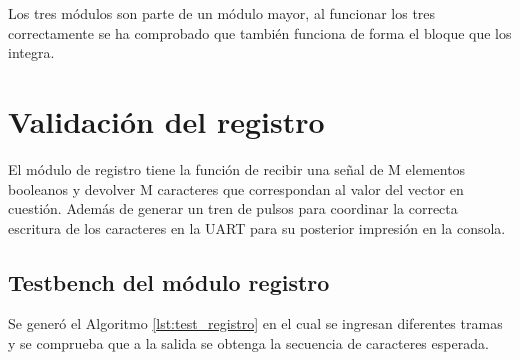 		Los tres módulos son parte de un módulo mayor, al funcionar los tres correctamente se ha comprobado que también funciona de forma el bloque que los integra.
		
\section{Validación del registro}

	El módulo de registro tiene la función de recibir una señal de M elementos booleanos y devolver M caracteres que correspondan al valor del vector en cuestión. Además de generar un tren de pulsos para coordinar la correcta escritura de los caracteres en la UART para su posterior impresión en la consola.
	
	\subsection{Testbench del módulo registro}
			
		Se generó el Algoritmo \ref{lst:test_registro} en el cual se ingresan diferentes tramas y se comprueba que a la salida se obtenga la secuencia de caracteres esperada.		
			

